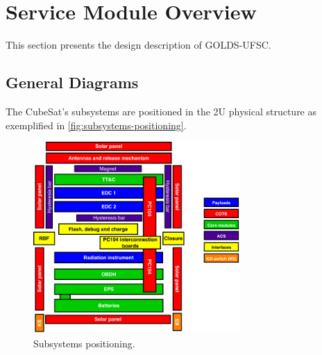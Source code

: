 %
%
%
%
%

%
%
%
%
%
%

\chapter{Service Module Overview} \label{ch:design}

This section presents the design description of GOLDS-UFSC.

\section{General Diagrams}

The CubeSat's subsystems are positioned in the 2U physical structure as exemplified in \autoref{fig:subsystems-positioning}. 

\begin{figure}[!htb]
    \begin{center}
        \includegraphics[width=0.7\textwidth]{figures/subsystems-positioning.pdf}
        \caption{Subsystems positioning.}
        \label{fig:subsystems-positioning}
    \end{center}
\end{figure}

